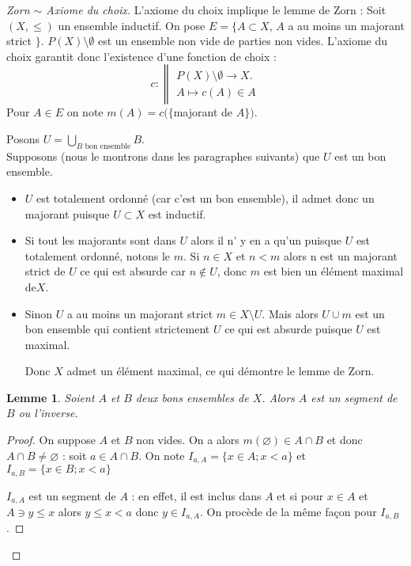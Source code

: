 \documentclass[12pt,a4paper]{amsart}
\newtheorem{lem}[thm]{\bf Lemme}
\begin{document}
\begin{proof}[Zorn $\sim$ Axiome du choix]
L'axiome du choix implique le lemme de Zorn : Soit $(X,\leq )$ un ensemble inductif. On pose $E=\{A \subset X$, $A$ a au moins un majorant strict $\}$. $P(X)\setminus\emptyset$ est un ensemble non vide de parties non vides. L'axiome du choix garantit donc l'existence d'une fonction de choix : 
$$
c : \left\|
    \begin{array}{ll}
       P(X)\setminus\emptyset \rightarrow X. \\
        A\mapsto c(A) \in A
    \end{array}
\right.
$$
Pour $A\in E$ on note $m(A)=c(\{$majorant de $A\})$. 

Posons $U = \bigcup_{B \mbox{ bon ensemble} }B$. \\

Supposons (nous le montrons dans les paragraphes suivants) que $U$ est un bon ensemble. 
\begin{itemize}
\item $U$ est totalement ordonné (car c'est un bon ensemble), il admet donc un majorant puisque $U\subset X$ est inductif.
\item Si tout les majorants sont dans $U$ alors il n' y en a qu'un puisque $U$ est totalement ordonné, notons le $m$. Si $n\in X$ et $n<m$ alors n est un majorant strict de $U$ ce qui est absurde car $n \notin U$, donc $m$ est bien un élément maximal de$X$. 
\item Sinon $U$ a au moins un majorant strict $m \in X\setminus U$. Mais alors $U \cup {m}$ est un bon ensemble qui contient strictement $U $ ce qui est absurde puisque $U$ est maximal. 

Donc $X$ admet un élément maximal, ce qui démontre le lemme de Zorn. 
\end{itemize}


\begin{lem}
Soient $A$ et $B$ deux bons ensembles de $X$. Alors $A$ est un segment de $B$ ou l'inverse. 
\end{lem}

\begin{proof}
On suppose $A$ et $B$ non vides. On a alors $m(\varnothing) \in A\cap B $ et donc $A\cap B \neq \varnothing$ : soit $ a \in A \cap B$. On note $I_{a,A}=\{x\in A; x<a\}$ et $I_{a,B}=\{x\in B; x<a\}$ 

$I_{a,A}$ est un segment de $A$ : en effet, il est inclus dans $A$ et si pour $x \in A $ et $A \ni y \leq x$ alors $ y\leq x < a $ donc $y\in I_{a,A}$. On procède de la même façon pour $I_{a,B}$.


\end{proof}
\end{proof}
\end{document}
